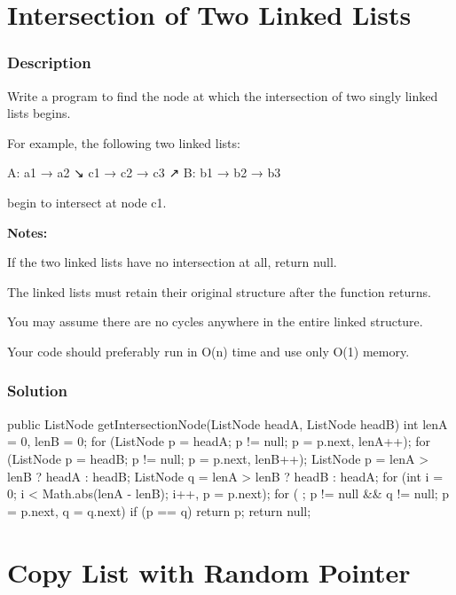 \newpage

\section{Intersection of Two Linked Lists} %

\subsubsection{Description}
Write a program to find the node at which the intersection of two singly linked lists begins.

For example, the following two linked lists:
\begin{Code}
A:          a1 → a2
                   ↘
                     c1 → c2 → c3
                   ↗
B:     b1 → b2 → b3
\end{Code}

begin to intersect at node c1.


\textbf{Notes:}

If the two linked lists have no intersection at all, return null.

The linked lists must retain their original structure after the function returns.

You may assume there are no cycles anywhere in the entire linked structure.

Your code should preferably run in O(n) time and use only O(1) memory.
\subsubsection{Solution}

\begin{Code}
public ListNode getIntersectionNode(ListNode headA, ListNode headB) {
    int lenA = 0, lenB = 0;
    for (ListNode p = headA; p != null; p = p.next, lenA++);
    for (ListNode p = headB; p != null; p = p.next, lenB++);
    ListNode p = lenA > lenB ? headA : headB;
    ListNode q = lenA > lenB ? headB : headA;
    for (int i = 0; i < Math.abs(lenA - lenB); i++, p = p.next);
    for ( ; p != null && q != null; p = p.next, q = q.next) {
        if (p == q) {
            return p;
        }
    }
    return null;
}
\end{Code}

\newpage

\section{Copy List with Random Pointer} %

